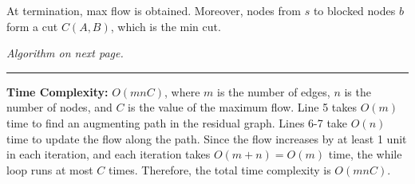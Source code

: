\begin{theo}

    At termination, max flow is obtained. Moreover, nodes from $s$ to blocked nodes $b$ form a cut $C(A,B)$, which is the min cut.
\end{theo}

\vfill

\begin{center}
    \textit{Algorithm on next page.}
\end{center}

\vfill

\newpage

\begin{Func}

    \vspace{-.5em}
    \begin{algorithm}[H]

        \vspace{.5em}
    \end{algorithm}
    
    \noindent
    \rule{\textwidth}{0.4pt}
    \textbf{Time Complexity:} $O(mnC)$, where $m$ is the number of edges, $n$ is the number of nodes, 
    and $C$ is the value of the maximum flow. Line 5 takes $O(m)$ time to find an augmenting path in the residual graph. Lines 6-7 take $O(n)$ time to update the flow along the path. Since the flow increases by at least 1 unit in each iteration, and each iteration takes $O(m + n) = O(m)$ time, the while loop runs at most $C$ times. Therefore, the total time complexity is $O(mnC)$.

\end{Func}

